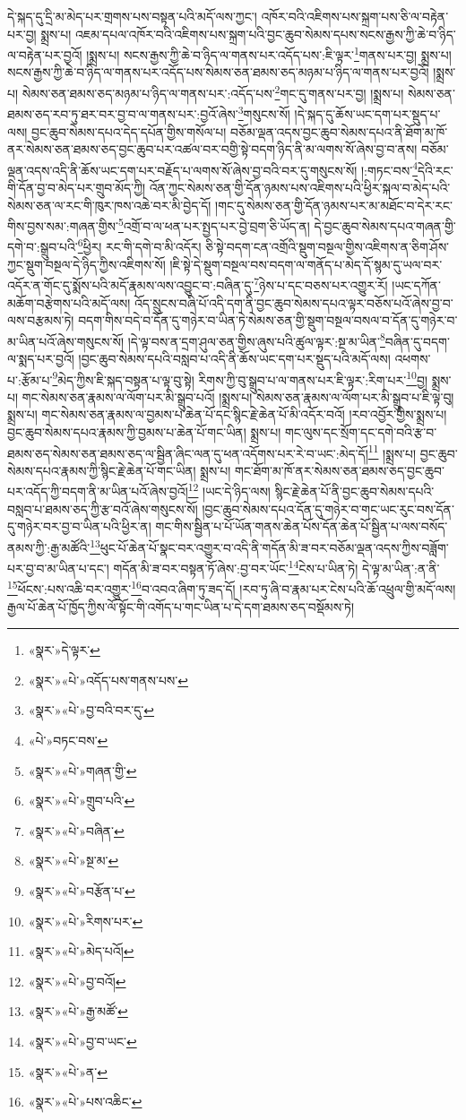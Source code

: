 དེ་སྐད་དུ་དྲི་མ་མེད་པར་གྲགས་པས་བསྟན་པའི་མདོ་ལས་ཀྱང་། འཁོར་བའི་འཇིགས་པས་སྐྲག་པས་ཅི་ལ་བརྟེན་པར་བྱ། སྨྲས་པ། འཇམ་དཔལ་འཁོར་བའི་འཇིགས་པས་སྐྲག་པའི་བྱང་ཆུབ་སེམས་དཔས་སངས་རྒྱས་ཀྱི་ཆེ་བ་ཉིད་ལ་བརྟེན་པར་བྱའོ། །སྨྲས་པ། སངས་རྒྱས་ཀྱི་ཆེ་བ་ཉིད་ལ་གནས་པར་འདོད་པས་:ཇི་ལྟར་\footnote{«སྣར་»དེ་ལྟར་}གནས་པར་བྱ། སྨྲས་པ། སངས་རྒྱས་ཀྱི་ཆེ་བ་ཉིད་ལ་གནས་པར་འདོད་པས་སེམས་ཅན་ཐམས་ཅད་མཉམ་པ་ཉིད་ལ་གནས་པར་བྱའོ། །སྨྲས་པ། སེམས་ཅན་ཐམས་ཅད་མཉམ་པ་ཉིད་ལ་གནས་པར་:འདོད་པས་\footnote{«སྣར་»«པེ་»འདོད་པས་གནས་པས་}གང་དུ་གནས་པར་བྱ། །སྨྲས་པ། སེམས་ཅན་ཐམས་ཅད་རབ་ཏུ་ཐར་བར་བྱ་བ་ལ་གནས་པར་:བྱའོ་ཞེས་\footnote{«སྣར་»«པེ་»བྱ་བའི་བར་དུ་}གསུངས་སོ། །དེ་སྐད་དུ་ཆོས་ཡང་དག་པར་སྡུད་པ་ལས། བྱང་ཆུབ་སེམས་དཔའ་དེད་དཔོན་གྱིས་གསོལ་པ། བཅོམ་ལྡན་འདས་བྱང་ཆུབ་སེམས་དཔའ་ནི་ཐོག་མ་ཁོ་ནར་སེམས་ཅན་ཐམས་ཅད་བྱང་ཆུབ་པར་འཚལ་བར་བགྱི་སྟེ་བདག་ཉིད་ནི་མ་ལགས་སོ་ཞེས་བྱ་བ་ནས། བཅོམ་ལྡན་འདས་འདི་ནི་ཆོས་ཡང་དག་པར་བརྗོད་པ་ལགས་སོ་ཞེས་བྱ་བའི་བར་དུ་གསུངས་སོ། །:གཏང་བས་\footnote{«པེ་»བཏང་བས་}དེའི་རང་གི་དོན་བྱ་བ་མེད་པར་གྲུབ་མོད་ཀྱི། འོན་ཀྱང་སེམས་ཅན་གྱི་དོན་ཉམས་པས་འཇིགས་པའི་ཕྱིར་སྐལ་བ་མེད་པའི་སེམས་ཅན་ལ་རང་གི་ཁུར་ཁས་འཆེ་བར་མི་བྱེད་དོ། །གང་དུ་སེམས་ཅན་གྱི་དོན་ཉམས་པར་མ་མཐོང་བ་དེར་རང་གིས་བྱས་སམ་:གཞན་གྱིས་\footnote{«སྣར་»«པེ་»གཞན་གྱི་}འགྲོ་བ་ལ་ཕན་པར་སྤྱད་པར་བྱེ་བྲག་ཅི་ཡོད་ན། དེ་བྱང་ཆུབ་སེམས་དཔའ་གཞན་གྱི་དགེ་བ་:སྒྲུབ་པའི་\footnote{«སྣར་»«པེ་»གྲུབ་པའི་}ཕྱིར། རང་གི་དགེ་བ་མི་འདོར། ཅི་སྟེ་བདག་ངན་འགྲོའི་སྡུག་བསྔལ་གྱིས་འཇིགས་ན་ཅིག་ཤོས་ཀྱང་སྡུག་བསྔལ་དེ་ཉིད་ཀྱིས་འཇིགས་སོ། །ཇི་སྟེ་དེ་སྡུག་བསྔལ་བས་བདག་ལ་གནོད་པ་མེད་དོ་སྙམ་དུ་ཡལ་བར་འདོར་ན་གོང་དུ་སྨོས་པའི་མདོ་རྣམས་ལས་འབྱུང་བ་:བཞིན་དུ་\footnote{«སྣར་»«པེ་»བཞིན་}ཉེས་པ་དང་བཅས་པར་འགྱུར་རོ། །ཡང་དཀོན་མཆོག་བརྩེགས་པའི་མདོ་ལས། འོད་སྲུངས་བཞི་པོ་འདི་དག་ནི་བྱང་ཆུབ་སེམས་དཔའ་ལྟར་བཅོས་པའོ་ཞེས་བྱ་བ་ལས་བརྩམས་ཏེ། བདག་གིས་བདེ་བ་དོན་དུ་གཉེར་བ་ཡིན་ཏེ་སེམས་ཅན་གྱི་སྡུག་བསྔལ་བསལ་བ་དོན་དུ་གཉེར་བ་མ་ཡིན་པའོ་ཞེས་གསུངས་སོ། །དེ་ལྟ་བས་ན་དྲག་ཤུལ་ཅན་གྱིས་ཞུས་པའི་ཚུལ་ལྟར་:སྔ་མ་ཡིན་\footnote{«སྣར་»«པེ་»སྔ་མ་}བཞིན་དུ་བདག་ལ་སྨད་པར་བྱའོ། །བྱང་ཆུབ་སེམས་དཔའི་བསླབ་པ་འདི་ནི་ཆོས་ཡང་དག་པར་སྡུད་པའི་མདོ་ལས། འཕགས་པ་:རྩོམ་པ་\footnote{«སྣར་»«པེ་»བརྩོན་པ་}མེད་ཀྱིས་ཇི་སྐད་བསྟན་པ་ལྟ་བུ་སྟེ། རིགས་ཀྱི་བུ་སྒྲུབ་པ་ལ་གནས་པར་ཇི་ལྟར་:རིག་པར་\footnote{«སྣར་»«པེ་»རིགས་པར་}བྱ། སྨྲས་པ། གང་སེམས་ཅན་རྣམས་ལ་ལོག་པར་མི་སྒྲུབ་པའོ། །སྨྲས་པ། སེམས་ཅན་རྣམས་ལ་ལོག་པར་མི་སྒྲུབ་པ་ཇི་ལྟ་བུ། སྨྲས་པ། གང་སེམས་ཅན་རྣམས་ལ་བྱམས་པ་ཆེན་པོ་དང་སྙིང་རྗེ་ཆེན་པོ་མི་འདོར་བའོ། །རབ་འབྱོར་གྱིས་སྨྲས་པ། བྱང་ཆུབ་སེམས་དཔའ་རྣམས་ཀྱི་བྱམས་པ་ཆེན་པོ་གང་ཡིན། སྨྲས་པ། གང་ལུས་དང་སྲོག་དང་དགེ་བའི་རྩ་བ་ཐམས་ཅད་སེམས་ཅན་ཐམས་ཅད་ལ་སྦྱིན་ཞིང་ལན་དུ་ཕན་འདོགས་པར་རེ་བ་ཡང་:མེད་དོ།\footnote{«སྣར་»«པེ་»མེད་པའོ།} །སྨྲས་པ། བྱང་ཆུབ་སེམས་དཔའ་རྣམས་ཀྱི་སྙིང་རྗེ་ཆེན་པོ་གང་ཡིན། སྨྲས་པ། གང་ཐོག་མ་ཁོ་ནར་སེམས་ཅན་ཐམས་ཅད་བྱང་ཆུབ་པར་འདོད་ཀྱི་བདག་ནི་མ་ཡིན་པའོ་ཞེས་བྱའོ།\footnote{«སྣར་»«པེ་»བྱ་བའོ།} །ཡང་དེ་ཉིད་ལས། སྙིང་རྗེ་ཆེན་པོ་ནི་བྱང་ཆུབ་སེམས་དཔའི་བསླབ་པ་ཐམས་ཅད་ཀྱི་རྩ་བའོ་ཞེས་གསུངས་སོ། །བྱང་ཆུབ་སེམས་དཔའ་དོན་དུ་གཉེར་བ་གང་ཡང་རུང་བས་དོན་དུ་གཉེར་བར་བྱ་བ་ཡིན་པའི་ཕྱིར་ན། གང་གིས་སྦྱིན་པ་པོ་ཡོན་གནས་ཆེན་པོས་དོན་ཆེན་པོ་སྦྱིན་པ་ལས་བསོད་ནམས་ཀྱི་:རྒྱ་མཚོའི་\footnote{«སྣར་»«པེ་»རྒྱ་མཚོ་}ཕུང་པོ་ཆེན་པོ་སྣང་བར་འགྱུར་བ་འདི་ནི་གདོན་མི་ཟ་བར་བཅོམ་ལྡན་འདས་ཀྱིས་བཟློག་པར་བྱ་བ་མ་ཡིན་པ་དང་། གདོན་མི་ཟ་བར་བསྟན་ཏོ་ཞེས་:བྱ་བར་ཡོང་\footnote{«སྣར་»«པེ་»བྱ་བ་ཡང་}ངེས་པ་ཡིན་ཏེ། དེ་ལྟ་མ་ཡིན་:ན་ནི་\footnote{«སྣར་»«པེ་»ན་}ཕོངས་:པས་འཆི་བར་འགྱུར་\footnote{«སྣར་»«པེ་»པས་འཆིང་}བ་འབའ་ཞིག་ཏུ་ཟད་དོ། །རབ་ཏུ་ཞི་བ་རྣམ་པར་ངེས་པའི་ཆོ་འཕྲུལ་གྱི་མདོ་ལས། རྒྱལ་པོ་ཆེན་པོ་ཁྱོད་ཀྱིས་ལོ་སྟོང་གི་འགོད་པ་གང་ཡིན་པ་དེ་དག་ཐམས་ཅད་བསྡོམས་ཏེ། 